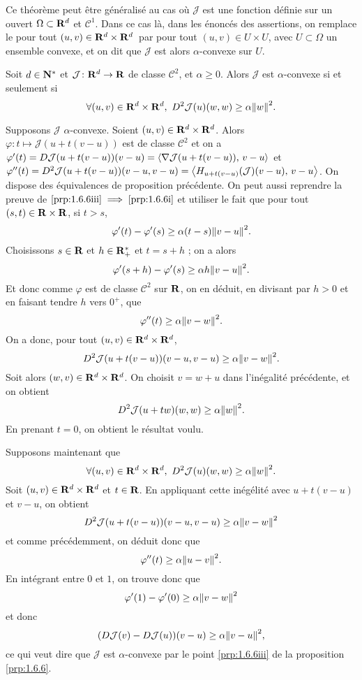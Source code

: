 \documentclass[grape]{../ceri/sty/MasterNotes}
\newcommand\J{\mathcal J}
\begin{document}
\begin{rem}\label{rem:1.6.6}
    Ce théorème peut être généralisé au cas où $\J$ est une fonction définie sur un ouvert $\Omega\subset\mathbf{R}^d$ et $\mathcal C^1$. Dans ce cas là, dans les énoncés des assertions, on remplace le \og pour tout $(u,v)\in\mathbf{R}^d\times\mathbf{R}^d$\fg\ par \og pour tout $(u,v)\in U\times U$\fg, avec $U\subset\Omega$ un ensemble convexe, et on dit que $\J$ est alors $\alpha$-convexe sur $U$.
\end{rem}

\begin{propo}
    Soit $d\in\mathbf{N}^*$ et $\J\colon\R^d\to\R$ de classe $\mathcal C^2$, et $\alpha\ge 0$. Alors $\J$ est $\alpha$-convexe si et seulement si
    \[ \forall (u,v)\in\R^d\times\R^d,\ D^2\J(u)(w,w)\ge\alpha\norme w^2. \]
\end{propo}

\begin{demo}
    Supposons $\J$ $\alpha$-convexe. Soient $(u,v)\in\mathbf{R}^d\times\mathbf{R}^d$. Alors $\varphi\colon t\mapsto\J(u+t(v-u))$ est de classe $\mathcal C^2$ et on a $\varphi'(t)=D\J(u+t(v-u))(v-u)=\ps{\nabla\J(u+t(v-u))}{v-u}$ et $\varphi''(t) = D^2\J(u+t(v-u))(v-u,v-u) = \ps{H_{u+t(v-u)}(\J)(v-u)}{v-u}$. On dispose des équivalences de proposition précédente. On peut aussi reprendre la preuve de $\ref{prp:1.6.6iii}\implies\ref{prp:1.6.6i}$ et utiliser le fait que pour tout $(s,t)\in\mathbf{R}\times\mathbf{R}$, si $t>s$,
    \[ \varphi'(t) - \varphi'(s)\ge \alpha(t-s)\norme{v-u}^2. \]
    Choisissons $s\in\mathbf{R}$ et $h\in\mathbf{R}_+^*$ et $t=s+h$ ; on a alors
    \[ \varphi'(s+h) - \varphi'(s)\ge \alpha h\norme{v-u}^2. \]
    Et donc comme $\varphi$ est de classe $\mathcal C^2$ sur $\mathbf{R}$, on en déduit, en divisant par $h>0$ et en faisant tendre $h$ vers $0^+$, que
    \[ \varphi''(t)\ge\alpha\norme{v-w}^2. \]
    On a donc, pour tout $(u,v)\in\mathbf{R}^d\times\mathbf{R}^d$,
    \[ D^2\J(u+t(v-u))(v-u,v-u)\ge \alpha\norme{v-w}^2. \]
    Soit alors $(w,v)\in\mathbf{R}^d\times\mathbf{R}^d$. On choisit $v=w+u$ dans l'inégalité précédente, et on obtient
    \[ D^2\J(u+tw)(w,w)\ge\alpha\norme{w}^2. \]
    En prenant $t=0$, on obtient le résultat voulu.

    Supposons maintenant que
    \[ \forall (u,v)\in\R^d\times\R^d,\ D^2\J(u)(w,w)\ge\alpha\norme w^2. \]
    Soit $(u,v)\in\mathbf{R}^d\times\mathbf{R}^d$ et $t\in\mathbf{R}$. En appliquant cette inégélité avec $u+t(v-u)$ et $v-u$, on obtient
    \[ D^2\J(u+t(v-u))(v-u,v-u)\ge \alpha\norme{v-w}^2 \]
    et comme précédemment, on déduit donc que
    \[ \varphi''(t)\ge\alpha\norme{u-v}^2. \]
    En intégrant entre $0$ et $1$, on trouve donc que
    \[ \varphi'(1) - \varphi'(0)\ge\alpha\norme{v-w}^2 \]
    et donc
    \[ \left( D\J(v) - D\J(u) \right)(v-u)\ge\alpha\norme{v-u}^2, \]
    ce qui veut dire que $\J$ est $\alpha$-convexe par le point \ref{prp:1.6.6iii} de la proposition \ref{prp:1.6.6}.
\end{demo}
\end{document}
